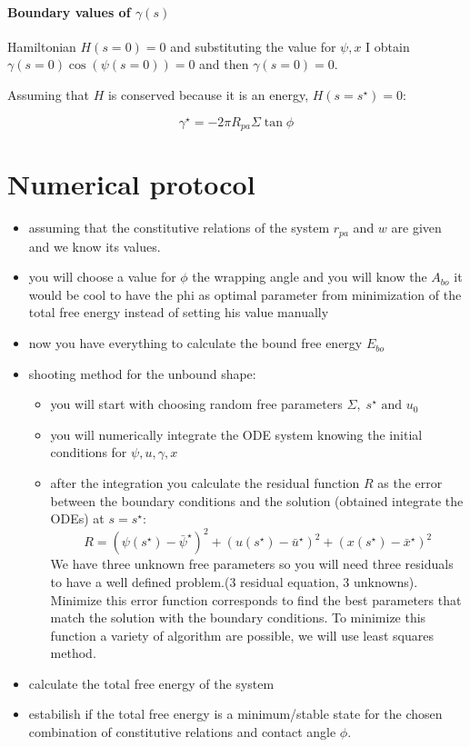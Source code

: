 \documentclass[12pt]{article}
\begin{document}
\paragraph*{Boundary values of $\gamma(s)$}
Hamiltonian $H(s=0)=0$ and substituting the value for $\psi,x$ I obtain $\gamma(s=0) \cos(\psi(s=0))=0$ and then $\gamma(s=0)=0$. 

Assuming that $H$ is conserved because it is an energy, $H(s=s^\star)=0$: 

$$
\gamma^\star = - 2 \pi R_{pa} \Sigma \tan \phi
$$

\section{Numerical protocol}
\begin{itemize}
  \item assuming that the constitutive relations of the system $r_{pa}$ and $w$ are given and we know its values.
  \item you will choose a value for $\phi$ the wrapping angle and you will know the $A_{bo}$ \alert{it would be cool to have the phi as optimal parameter from minimization of the total free energy instead of setting his value manually}
  \item now you have everything to calculate the bound free energy $E_{bo}$
  \item shooting method for the unbound shape: 
    \begin{itemize}
      \item you will start with choosing random free parameters $\Sigma,\; s^\star \text{ and }u_0$
      \item you will numerically integrate the ODE system knowing the initial conditions for $\psi,u,\gamma,x$
      \item after the integration you calculate the residual function $R$ as the error between the boundary conditions and the solution (obtained integrate the ODEs) at $s=s^\star$:
      $$
      R = (\psi(s^\star) - \bar{\psi}^\star)^2  + (u(s^\star) - \bar{u}^\star)^2 +  (x(s^\star) -\bar{x}^\star)^2 
      $$
      We have three unknown free parameters so you will need three residuals to have a well defined problem.(3 residual equation, 3 unknowns). Minimize this error function corresponds to find the best parameters that match the solution with the boundary conditions. To minimize this function a variety of algorithm are possible, we will use least squares method. 
    \end{itemize}
  \item calculate the total free energy of the system
  \item estabilish if the total free energy is a minimum/stable state for the chosen combination of constitutive relations and contact angle $\phi$.
\end{itemize}
\end{document}
